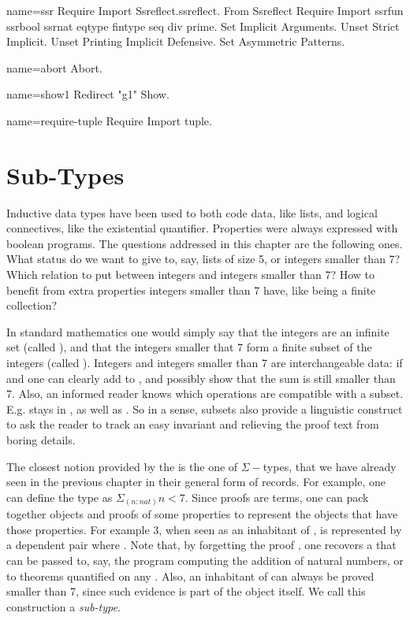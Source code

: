 \begin{coqdef}{name=ssr}
Require Import Ssreflect.ssreflect.
From Ssreflect Require Import ssrfun ssrbool ssrnat eqtype fintype seq div prime.
Set Implicit Arguments.
Unset Strict Implicit.
Unset Printing Implicit Defensive.
Set Asymmetric Patterns.
\end{coqdef}
\begin{coqdef}{name=abort}
Abort.
\end{coqdef}
\begin{coqdef}{name=show1}
Redirect "g1" Show.
\end{coqdef}
\begin{coqdef}{name=require-tuple}
Require Import tuple.
\end{coqdef}

\chapter{Sub-Types}{}\label{ch:sigmabool}

Inductive data types have been used to both code data, like lists, and
logical connectives, like the existential quantifier.
Properties were always expressed with
boolean programs.  The questions addressed in this chapter are the
following ones.  What
status do we want to give to, say, lists of size 5,  or integers
smaller than 7?  Which relation to put between integers and
integers smaller than 7?  How to benefit from extra properties
integers smaller than 7 have, like being a finite collection?

In standard mathematics one would simply say that the integers are an
infinite set (called ), and that the integers smaller that 7
form a finite subset of the integers (called ).  Integers and
integers smaller than 7 are interchangeable data: if  and
 one can clearly add  to , and possibly show
that the sum is still smaller than 7.  Also, an informed reader
knows which operations are compatible with a subset. E.g. 
stays in , as well as .  So in a sense, subsets
also provide a linguistic construct to ask the reader to track an
easy invariant and relieving the proof text from boring details.

The closest notion provided by the \mcbCIC{} is the one of $\Sigma-$types,
that we have already seen in the previous chapter in their general
form of records.
For example, one can define the type  as $\Sigma_{(n:nat)} n
< 7$.  Since proofs are terms, one can
pack together objects and proofs of some properties to
represent the objects that have those properties.  For example $3$,
when seen as an inhabitant of , is represented by a dependent
pair  where .  Note that, by forgetting the
proof , one recovers a  that can be passed to, say, the
program computing the addition of natural numbers, or to theorems
quantified on any .  Also, an inhabitant of  can always
be proved smaller than 7, since such evidence is part of the
object itself.
We call this construction a \emph{sub-type}.

